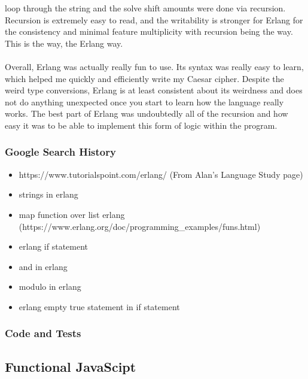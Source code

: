 \documentclass[letterpaper, 10pt, DIV=13]{scrartcl}
\numberwithin{equation}{section}
\numberwithin{figure}{section}
\numberwithin{table}{section}
\begin{document}
loop through the string and the solve shift amounts were done via recursion. Recursion is extremely easy to read, and the writability is stronger for Erlang 
for the consistency and minimal feature multiplicity with recursion being the way. This is the way, the Erlang way.
\\ \\
Overall, Erlang was actually really fun to use. Its syntax was really easy to learn, which helped me quickly and efficiently write my Caesar cipher.
Despite the weird type conversions, Erlang is at least consistent about its weirdness and does not do anything unexpected once you start to learn
how the language really works. The best part of Erlang was undoubtedly all of the recursion and how easy it was to be able to implement this form of logic
within the program.

\subsubsection{Google Search History}
\begin{itemize}
    \item https://www.tutorialspoint.com/erlang/ (From Alan's Language Study page)
    \item strings in erlang
    \item map function over list erlang (https://www.erlang.org/doc/programming\_examples/funs.html)
    \item erlang if statement
    \item and in erlang
    \item modulo in erlang
    \item erlang empty true statement in if statement
\end{itemize}

\subsubsection{Code and Tests}



\subsection{Functional JavaScipt}
\end{document}
